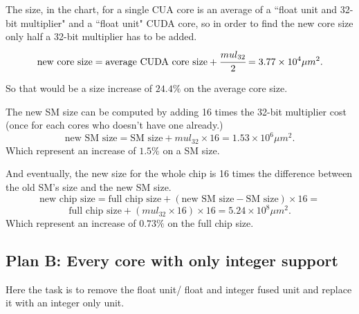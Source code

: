 \documentclass{report}
\begin{document}
    The size, in the chart, for a single CUA core is an average of a ``float unit and 32-bit multiplier"
    and a ``float unit" CUDA core, so in order to find the new core size only half a 32-bit multiplier has to be added.
    \[\text{new core size} = \text{average CUDA core size} + \cfrac{mul_{32}}{2} = 3.77 \times 10^4 \mu m^2 .\] 
    
    So that would be a size increase of $24.4\%$ on the average core size.
    
    The new SM size can be computed by adding 16 times the 32-bit multiplier cost (once for each cores who doesn't have one already.)
    \[\text{new SM size} = \text{SM size} + mul_{32} \times 16 = 1.53 \times 10^6 \mu m^2 .\]
    Which represent an increase of $1.5\%$ on a SM size.
    
    And eventually, the new size for the whole chip is 16 times the difference between the old SM's size and the new SM size.
    \[\text{new chip size} = \text{full chip size} + (\text{new SM size} - \text{SM size}) \times 16 =\]
    \[\text{full chip size} + (mul_{32} \times 16) \times  16 = 5.24 \times 10^8 \mu m^2 .\]
    Which represent an increase of $0.73\%$ on the full chip size.
   
   \subsection{Plan B: Every core with only integer support}
   Here the task is to remove the float unit/ float and integer fused unit and replace it with an integer only unit.
   
\end{document}
